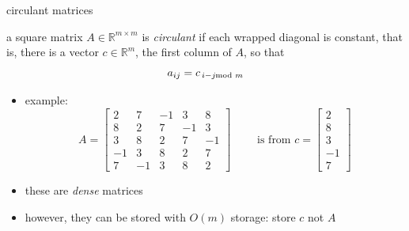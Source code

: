 \documentclass[10pt,
               svgnames,
               hyperref={colorlinks,citecolor=DeepPink4,linkcolor=FireBrick,urlcolor=Maroon},
               usepdftitle=false]{beamer}
\newcommand{\RR}{\mathbb{R}}
\begin{document}
\begin{frame}{circulant matrices}

\begin{definition}
a square matrix $A \in \RR^{m\times m}$ is \emph{circulant} if each wrapped diagonal is constant, that is, there is a vector $c \in \RR^m$, the first column of $A$, so that
	$$a_{ij} = c_{\,i - j \hspace{-2mm} \mod m}$$
\end{definition}

\begin{itemize}
\item example:
	$$A = \begin{bmatrix} 2 & 7 & -1 & 3 & 8 \\ 8 & 2 & 7 & -1 & 3 \\ 3 & 8 & 2 & 7 & -1 \\ -1 & 3 & 8 & 2 & 7 \\ 7 & -1 & 3 & 8 & 2 \end{bmatrix} \qquad \text{ is from } c = \begin{bmatrix} 2 \\ 8 \\ 3 \\ -1 \\ 7 \end{bmatrix}$$
\item these are \emph{dense} matrices
\item however, they can be stored with $O(m)$ storage: store $c$ not $A$
\end{itemize}
\end{frame}
\end{document}

